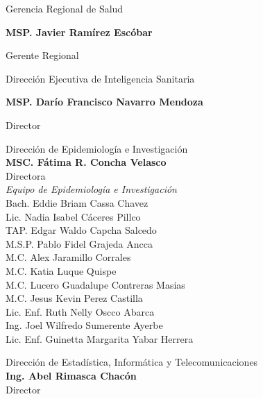 \documentclass[12pt,a4paper,openany]{book}
\begin{document}
	
	\begin{center}
		
		{\large Gerencia Regional de Salud}
		
		\textbf{MSP. Javier Ramírez Escóbar}
		
		Gerente Regional \vspace{1.0cm}
		
		Dirección Ejecutiva de Inteligencia Sanitaria
		
		\textbf{MSP. Darío Francisco Navarro Mendoza}
		
		Director
		
		\vspace{1.5cm}
		\noindent
		\begin{minipage}[t]{.45\textwidth}
			\centering
			Dirección de Epidemiología e Investigación  \\
			\textbf{MSC. Fátima R. Concha Velasco}\\
			Directora \vspace{1.0cm}\\
			\textit{Equipo de Epidemiología e Investigación }\vspace{.5cm}\\
			Bach. Eddie Briam Cassa Chavez \\
			Lic. Nadia Isabel Cáceres Pillco \\
			TAP. Edgar Waldo Capcha Salcedo \\
			M.S.P. Pablo Fidel Grajeda Ancca \\
			M.C. Alex Jaramillo Corrales \\ 
			M.C. Katia Luque Quispe \\
			M.C. Lucero Guadalupe Contreras Masias \\
			M.C. Jesus Kevin Perez Castilla \\
			Lic. Enf. Ruth Nelly Oscco Abarca \\
			Ing. Joel Wilfredo Sumerente Ayerbe \\
			Lic. Enf. Guinetta Margarita Yabar Herrera \vspace{1.5cm}\\	
		\end{minipage}
		\hfill
		\noindent
		\begin{minipage}[t]{.45\textwidth}
			\centering
			Dirección de Estadística, Informática y Telecomunicaciones\\
			\textbf{Ing. Abel Rimasca Chacón} \\
			Director \vspace{1.0cm} \\

\end{minipage}
\end{center}
\end{document}
